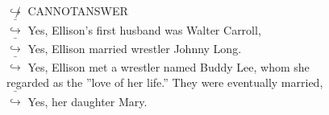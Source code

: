 \documentclass[11pt,a4paper, onecolumn]{article}
\begin{document}
\begin{figure}[t] \small \begin{tcolorbox}[boxsep=0pt,left=5pt,right=0pt,top=2pt,colback = yellow!5] \begin{dialogue}
 \small 
\colorbox{pink!25}{$\not\hookrightarrow$}
{ CANNOTANSWER }
\\
\colorbox{pink!25}{ $\bar{\hookrightarrow}$}
\colorbox{red!25}{Yes,}
{ Ellison's first husband was Walter Carroll, }
\\
\colorbox{pink!25}{ $\bar{\hookrightarrow}$}
\colorbox{red!25}{Yes,}
{ Ellison married wrestler Johnny Long. }
\\
\colorbox{pink!25}{ $\bar{\hookrightarrow}$}
\colorbox{red!25}{Yes,}
{ Ellison met a wrestler named Buddy Lee, whom she regarded as the ''love of her life.'' They were eventually married, }
\\
\colorbox{pink!25}{ $\bar{\hookrightarrow}$}
\colorbox{red!25}{Yes,}
{ her daughter Mary. }
\\
 \end{dialogue}\end{tcolorbox}\end{figure}
\end{document}
